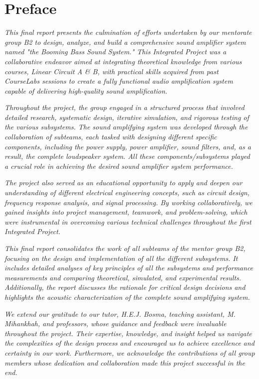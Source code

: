 \chapter*{Preface}

\textit{
This final report presents the culmination of efforts undertaken by our mentorate group B2 to design, analyze, and build a comprehensive sound amplifier system named "the Booming Bass Sound System." This Integrated Project was a collaborative endeavor aimed at integrating theoretical knowledge from various courses, Linear Circuit A \& B, with practical skills acquired from past CourseLabs sessions to create a fully functional audio amplification system capable of delivering high-quality sound amplification.}

\textit{Throughout the project, the group engaged in a structured process that involved detailed research, systematic design, iterative simulation, and rigorous testing of the various subsystems. The sound amplifying system was developed through the collaboration of subteams, each tasked with designing different specific components, including the power supply, power amplifier, sound filters, and, as a result, the complete loudspeaker system. All these components/subsystems played a crucial role in achieving the desired sound amplifier system performance.}

\textit{The project also served as an educational opportunity to apply and deepen our understanding of different electrical engineering concepts, such as circuit design, frequency response analysis, and signal processing. By working collaboratively, we gained insights into project management, teamwork, and problem-solving, which were instrumental in overcoming various technical challenges throughout the first Integrated Project.}

\textit{This final report consolidates the work of all subteams of the mentor group B2, focusing on the design and implementation of all the different subsystems. It includes detailed analyses of key principles of all the subsystems and performance measurements and comparing theoretical, simulated, and experimental results. Additionally, the report discusses the rationale for critical design decisions and highlights the acoustic characterization of the complete sound amplifying system.}

\textit{We extend our gratitude to our tutor, H.E.J. Bosma, teaching assistant, M. Mihankhah, and professors, whose guidance and feedback were invaluable throughout the project. Their expertise, knowledge, and insight helped us navigate the complexities of the design process and encouraged us to achieve excellence and certainty in our work. Furthermore, we acknowledge the contributions of all group members whose dedication and collaboration made this project successful in the end.}

